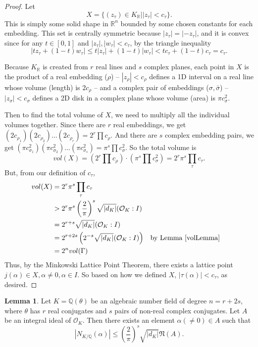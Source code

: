 \documentclass[12pt]{article}
\theoremstyle{definition}
\newtheorem{lemma}[theorem]{Lemma}
\begin{document}
\begin{proof}
    Let 
    \[
        X = \{(z_\tau) \in K_\mathbb{R} | |z_\tau| < c_\tau\}.
    \]
    This is simply some solid shape in $\mathbb{R}^n$ bounded by some chosen constants for each embedding.
    This set is centrally symmetric because $|z_\tau| = |-z_\tau|$, and it is convex since for any $t \in [0,1]$ and
    $|z_\tau|, |w_\tau| < c_\tau$, by the triangle inequality
    \[|tz_\tau+(1-t)w_\tau| \leq t|z_\tau|+(1-t)|w_\tau| < tc_\tau +(1-t)c_\tau = c_\tau.\]

    Because $K_\mathbb{R}$ is created from $r$ real lines and $s$ complex planes, each point in $X$ is the product of
    a real embedding ($\rho$) -- $|z_\rho| < c_\rho$ defines a 1D interval on a real line whose volume (length) is $2c_\rho$ --
    and a complex pair of embeddings ($\sigma, \bar{\sigma}$) -- $|z_\sigma| < c_\sigma$ defines a 2D disk in a complex plane whose volume (area) is $\pi c_\sigma^2$.

    Then to find the total volume of $X$, we need to multiply all the individual volumes together. Since there are $r$ real embeddings, we get
    $(2c_{\rho_1})(2c_{\rho_2})\dots(2c_{\rho_r}) = 2^r \prod c_\rho$. And there are $s$ complex embedding pairs, we get 
    $(\pi c_{\sigma_1}^2)(\pi c_{\sigma_2}^2)\dots(\pi c_{\sigma_s}^2) = \pi^s \prod c_\sigma^2$. So the total volume is
    \[vol(X) = (2^r \prod c_\rho) \cdot (\pi^s \prod c_\sigma^2) = 2^r \pi^s \prod_\tau c_\tau. \]
    But, from our definition of $c_\tau$,
    \begin{align*}
    vol(X) &= 2^r \pi^s \prod_{\tau} c_\tau \\
    &> 2^r \pi^s \left( \frac{2}{\pi} \right)^s \sqrt{|d_K|} (\mathcal{O}_K:I) \\
    &= 2^{r+s} \sqrt{|d_K|} (\mathcal{O}_K:I) \\
    &= 2^{r+2s} \left( 2^{-s} \sqrt{|d_K|} (\mathcal{O}_K:I) \right) && \text{by Lemma \ref{volLemma}} \\
    &= 2^n vol(\Gamma)
    \end{align*}
    Thus, by the Minkowski Lattice Point Theorem, there exists a lattice point $j(\alpha) \in X, \alpha \neq 0, \alpha \in I.$ So based on how we defined 
    $X$, $|\tau(\alpha)| < c_\tau$, as desired.
\end{proof}

\begin{lemma}\label{normElemBoundLemma}\cite{Eullery}
    Let $K=\mathbb{Q}(\theta)$ be an algebraic number field of degree $n=r+2s$, where $\theta$
    has $r$ real conjugates and $s$ pairs of non-real complex conjugates. Let $A$ be an integral ideal of $\mathcal{O}_K$.
    Then there exists an element $\alpha (\neq 0) \in A$ such that
    \[|N_{K/\mathbb{Q}}(\alpha)| \leq (\frac{2}{\pi})^s \sqrt{|d_K|}\mathfrak{N}(A).\] 
\end{lemma}
\end{document}
